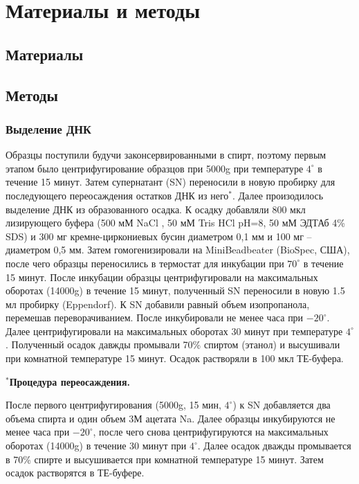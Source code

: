 \chapter{Материалы и методы} \label{chapt1}

\section{Материалы} \label{sect1_1}



\section{Методы} \label{sect1_2}

\subsection{Выделение ДНК} \label{subsect1_2_1}

Образцы поступили будучи законсервированными в спирт, поэтому первым этапом было центрифугирование образцов при 5000g при температуре $4^{\circ}$ в течение 15 минут. Затем супернатант (SN) переносили в новую пробирку для последующего переосаждения остатков ДНК из него$^*$. Далее произодилось выделение ДНК из образованного осадка. К осадку добавляли 800 мкл лизирующего буфера (500 мМ NaCl , 50 мМ Tris HCl pH=8, 50 мМ ЭДТАб 4\% SDS) и 300 мг кремне-циркониевых бусин диаметром 0,1 мм и 100 мг – диаметром 0,5 мм. Затем гомогенизировали на MiniBeadbeater (BioSpec, США), после чего образцы переносились в термостат для инкубации при $70^{\circ}$ в течение 15 минут. После инкубации образцы центрифугировали на максимальных оборотах (14000g) в течение 15 минут, полученный SN переносили в новую 1.5 мл пробирку (Eppendorf). К SN добавили равный объем изопропанола, перемешав переворачиванием. После инкубировали не менее часа при $-20^{\circ}$. Далее центрифугировали на максимальных оборотах 30 минут при температуре $4^{\circ}$ . Полученный осадок давжды промывали 70\% спиртом (этанол) и высушивали при комнатной температуре 15 минут. Осадок растворяли в 100 мкл ТЕ-буфера. 

$^*$\textbf{Процедура переосаждения.}

После первого центрифугирования (5000g, 15 мин, $4^{\circ}$) к SN добавляется два объема спирта и один объем 3М ацетата Na. Далее образцы инкубируются не менее часа при $-20^{\circ}$, после чего снова центрифугируются на максимальных оборотах (14000g) в течение 30 минут при $4^{\circ}$. Далее осадок дважды промывается в 70\% спирте и высушивается при комнатной температуре 15 минут. Затем осадок растворятся в ТЕ-буфере. 


